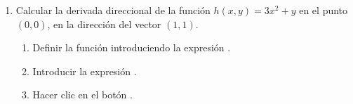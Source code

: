\begin{enumerate}[leftmargin=*]

\item Calcular la derivada direccional de la función $h(x,y)= 3x^2+y$ en el punto $(0,0)$, en la dirección del vector
$(1,1)$.
\begin{indicacion}
\begin{enumerate}
\item Definir la función introduciendo la expresión .
\item Introducir la expresión .
\item Hacer clic en el botón .
\end{enumerate}
\end{indicacion}


\end{enumerate}
